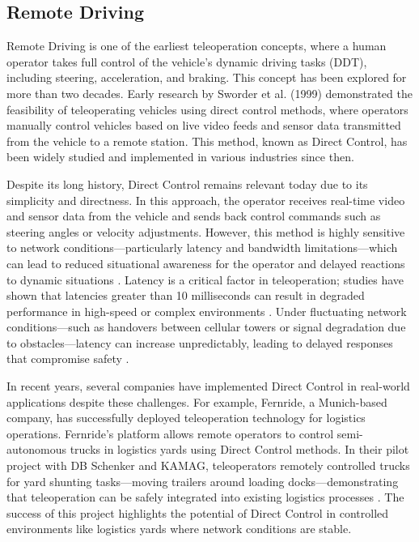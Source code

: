\subsection{Remote Driving}
Remote Driving is one of the earliest teleoperation concepts,
where a human operator takes full control of the vehicle's
dynamic driving tasks (DDT), including steering, acceleration,
and braking. This concept has been explored for more than two decades.
Early research by Sworder et al. \cite{sworder1999performance} (1999) demonstrated the feasibility
of teleoperating vehicles using direct control methods, where
operators manually control vehicles based on live video feeds and
sensor data transmitted from the vehicle to a remote station.
This method, known as Direct Control, has been widely studied
and implemented in various industries since then.

Despite its long history, Direct Control remains relevant
today due to its simplicity and directness. In this approach,
the operator receives real-time video and sensor data from the
vehicle and sends back control commands such as steering angles
or velocity adjustments. However, this method is highly sensitive
to network conditions—particularly latency and bandwidth
limitations—which can lead to reduced situational awareness for
the operator and delayed reactions to dynamic situations \cite{Gnatzig}.
Latency is a critical factor in teleoperation; studies have shown
that latencies greater than 10 milliseconds can result in degraded
performance in high-speed or complex environments \cite{chucholowski2014teleoperated}.
Under fluctuating network conditions—such as handovers
between cellular towers or signal degradation due to obstacles—latency
can increase unpredictably, leading to delayed responses that
compromise safety \cite{neumeier2023feasibility}.

In recent years, several companies have implemented Direct Control
in real-world applications despite these challenges. For example,
Fernride, a Munich-based company, has successfully deployed
teleoperation technology for logistics operations. Fernride's
platform allows remote operators to control semi-autonomous
trucks in logistics yards using Direct Control methods.
In their pilot project with DB Schenker and KAMAG,
teleoperators remotely controlled trucks for yard shunting
tasks—moving trailers around loading docks—demonstrating that
teleoperation can be safely integrated into existing logistics
processes \cite{fernride2023}. The success of this project
highlights the potential of Direct Control in controlled
environments like logistics yards where network conditions are stable.


